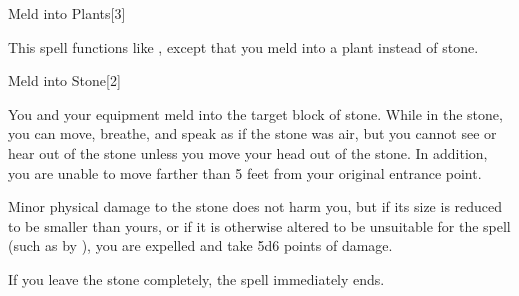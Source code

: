 \begin{spellsection}{Meld into Plants}[3]
    \begin{spellheader}
    \end{spellheader}
    \begin{spellcontent}
        \begin{spelltargetinginfo}
        \end{spelltargetinginfo}
        \begin{spelleffects}
            \spellspecial This spell functions like , except that you meld into a plant instead of stone.
        \end{spelleffects}
    \end{spellcontent}
    \begin{spellfooter}
        \miscastexplode
    \end{spellfooter}
\end{spellsection}

\begin{spellsection}{Meld into Stone}[2]
    \begin{spellheader}
    \end{spellheader}
    \begin{spellcontent}
        \begin{spelltargetinginfo}
        \end{spelltargetinginfo}
        \begin{spelleffects}
            \spelleffect You and your equipment meld into the target block of stone. While in the stone, you can move, breathe, and speak as if the stone was air, but you cannot see or hear out of the stone unless you move your head out of the stone. In addition, you are unable to move farther than 5 feet from your original entrance point.

            Minor physical damage to the stone does not harm you, but if its size is reduced to be smaller than yours, or if it is otherwise altered to be unsuitable for the spell (such as by ), you are expelled and take 5d6 points of damage.

            If you leave the stone completely, the spell immediately ends.

            \spelldur \durlong
        \end{spelleffects}
    \end{spellcontent}
    \begin{spellfooter}
        \miscastexplode
    \end{spellfooter}
\end{spellsection}

